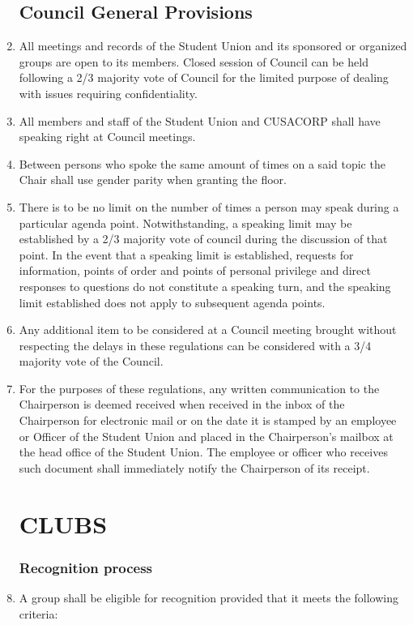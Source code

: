 \documentclass[oneside]{book}
\begin{document}
\begin{enumerate}
\chapter{\label{Council_General_Provisions}Council General Provisions }
\item All meetings and records of the Student Union and its sponsored or
organized groups are open to its members. Closed session of Council
can be held following a 2/3 majority vote of Council for the limited
purpose of dealing with issues requiring confidentiality. 
\item All members and staff of the Student Union and CUSACORP shall have
speaking right at Council meetings. 
\item Between persons who spoke the same amount of times on a said topic
the Chair shall use gender parity when granting the floor. 
\item There is to be no limit on the number of times a person may speak
during a particular agenda point. Notwithstanding, a speaking limit
may be established by a 2/3 majority vote of council during the discussion
of that point. In the event that a speaking limit is established,
requests for information, points of order and points of personal privilege
and direct responses to questions do not constitute a speaking turn,
and the speaking limit established does not apply to subsequent agenda
points. 
\item Any additional item to be considered at a Council meeting brought
without respecting the delays in these regulations can be considered
with a 3/4 majority vote of the Council. 
\item For the purposes of these regulations, any written communication to
the Chairperson is deemed received when received in the inbox of the
Chairperson for electronic mail or on the date it is stamped by an
employee or Officer of the Student Union and placed in the Chairperson's
mailbox at the head office of the Student Union. The employee or officer
who receives such document shall immediately notify the Chairperson
of its receipt. 

\part{\label{CLUBS}CLUBS }


\section{\label{Recognition_process}Recognition process }
\item A group shall be eligible for recognition provided that it meets the
following criteria: 


\end{enumerate}
\end{document}
